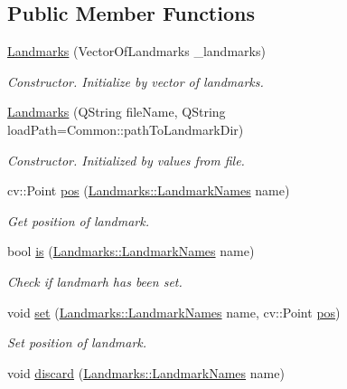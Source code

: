 \subsection*{Public Member Functions}
\begin{DoxyCompactItemize}
\item 
\hyperlink{class_landmarks_ad97ffa895a71e45b208ab4eb2fbd96ae}{Landmarks} (Vector\+Of\+Landmarks \+\_\+landmarks)
\begin{DoxyCompactList}\small\item\em Constructor. Initialize by vector of landmarks. \end{DoxyCompactList}\item 
\hyperlink{class_landmarks_a2d070b7086463daaa617c946c4576ae8}{Landmarks} (Q\+String file\+Name, Q\+String load\+Path=Common\+::path\+To\+Landmark\+Dir)
\begin{DoxyCompactList}\small\item\em Constructor. Initialized by values from file. \end{DoxyCompactList}\item 
cv\+::\+Point \hyperlink{class_landmarks_a24e9344ab527627e7aa9077ed1f39509}{pos} (\hyperlink{class_landmarks_a69362bef3ef2209cb2304ff7ea2ce91e}{Landmarks\+::\+Landmark\+Names} name)
\begin{DoxyCompactList}\small\item\em Get position of landmark. \end{DoxyCompactList}\item 
bool \hyperlink{class_landmarks_ad3d8c6a24f384016eaba29d078921350}{is} (\hyperlink{class_landmarks_a69362bef3ef2209cb2304ff7ea2ce91e}{Landmarks\+::\+Landmark\+Names} name)
\begin{DoxyCompactList}\small\item\em Check if landmarh has been set. \end{DoxyCompactList}\item 
void \hyperlink{class_landmarks_af52da543b2d0ece5bb17dbf7cbe6b6e9}{set} (\hyperlink{class_landmarks_a69362bef3ef2209cb2304ff7ea2ce91e}{Landmarks\+::\+Landmark\+Names} name, cv\+::\+Point \hyperlink{class_landmarks_a24e9344ab527627e7aa9077ed1f39509}{pos})
\begin{DoxyCompactList}\small\item\em Set position of landmark. \end{DoxyCompactList}\item 
void \hyperlink{class_landmarks_ae64ebc983fa10e85ab63768936c1a0ba}{discard} (\hyperlink{class_landmarks_a69362bef3ef2209cb2304ff7ea2ce91e}{Landmarks\+::\+Landmark\+Names} name)

\end{DoxyCompactItemize}
